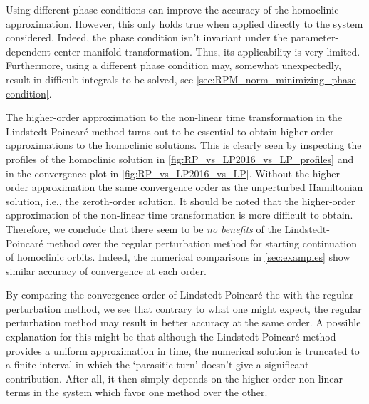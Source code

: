 Using different phase conditions can improve the accuracy of the homoclinic
approximation. However, this only holds true when applied directly to the system
considered. Indeed, the phase condition isn't invariant under the
parameter-dependent center manifold transformation. Thus, its applicability is
very limited. Furthermore, using a different phase condition may, somewhat
unexpectedly, result in difficult integrals to be solved, see
\cref{sec:RPM_norm_minimizing_phase condition}.

The higher-order approximation to the non-linear time transformation in the
Lindstedt-Poincar\'e method turns out to be essential to obtain higher-order
approximations to the homoclinic solutions. This is clearly seen by inspecting
the profiles of the homoclinic solution in
\cref{fig:RP_vs_LP2016_vs_LP_profiles} and in the convergence plot in
\cref{fig:RP_vs_LP2016_vs_LP}. Without the higher-order approximation the same
convergence order as the unperturbed Hamiltonian solution, i.e., the
zeroth-order solution. It should be noted that the higher-order approximation
of the non-linear time transformation is more difficult to obtain. Therefore,
we conclude that there seem to be \emph{no benefits} of the
Lindstedt-Poincar\'e method over the regular perturbation method for starting
continuation of homoclinic orbits. Indeed, the numerical comparisons in
\cref{sec:examples} show similar accuracy of convergence at each order.

By comparing the convergence order of Lindstedt-Poincar\'e the with the regular
perturbation method, we see that contrary to what one might expect, the
regular perturbation method may result in better accuracy at the same order. A
possible explanation for this might be that although the Lindstedt-Poincar\'e
method provides a uniform approximation in time, the numerical solution is
truncated to a finite interval in which the `parasitic turn' doesn't give a
significant contribution. After all, it then simply depends on the higher-order
non-linear terms in the system which favor one method over the other. 

